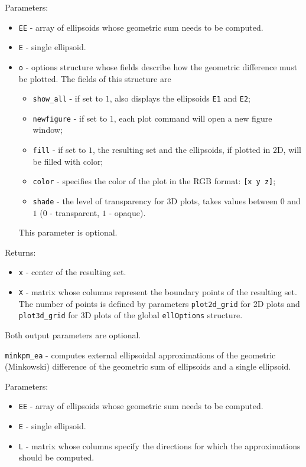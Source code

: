 \documentclass{report}
\begin{document}
Parameters:
\begin{itemize}
\item {\tt EE} - array of ellipsoids whose geometric sum needs to be computed.
\item {\tt E} - single ellipsoid.
\item {\tt o} - options structure whose fields describe how the geometric
difference must be plotted. The fields of this structure are
\begin{itemize}
\item {\tt show\_all} - if set to $1$, also displays the ellipsoids
{\tt E1} and {\tt E2};
\item {\tt newfigure} - if set to $1$, each plot command will open a new
figure window;
\item {\tt fill} - if set to $1$, the resulting set and the ellipsoids,
if plotted in 2D, will be filled with color;
\item {\tt color} - specifies the color of the plot in the RGB format:
{\tt [x y z]};
\item {\tt shade} - the level of transparency for 3D plots, takes values
between $0$ and $1$ ($0$ - transparent, $1$ - opaque).
\end{itemize}
This parameter is optional.
\end{itemize}

Returns:
\begin{itemize}
\item {\tt x} - center of the resulting set.
\item {\tt X} - matrix whose columns represent the boundary points of the
resulting set. The number of points is defined by parameters
{\tt plot2d\_grid} for 2D plots and {\tt plot3d\_grid} for 3D plots of the
global {\tt ellOptions} structure.
\end{itemize}
Both output parameters are optional.

\newpage

{\Large {\tt minkpm\_ea}} - computes external ellipsoidal approximations
of the geometric (Minkowski) difference of the geometric sum of ellipsoids
and a single ellipsoid.

Parameters:
\begin{itemize}
\item {\tt EE} - array of ellipsoids whose geometric sum needs to be computed.
\item {\tt E} - single ellipsoid.
\item {\tt L} - matrix whose columns specify the directions for which
the approximations should be computed.
\end{itemize}
\end{document}

